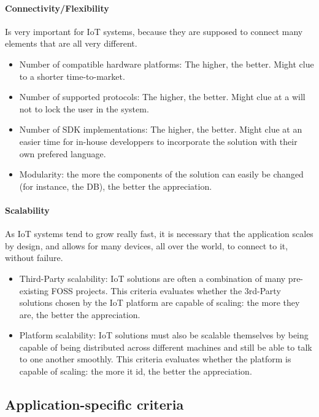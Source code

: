 \documentclass{article}
\begin{document}
\paragraph{Connectivity/Flexibility} Is very important for IoT systems, because they are supposed to connect many elements that are all very different.

\begin{itemize}
\item Number of compatible hardware platforms: The higher, the better. Might clue to a shorter time-to-market.
\item Number of supported protocols: The higher, the better. Might clue at a will not to lock the user in the system.
\item Number of SDK implementations: The higher, the better. Might clue at an easier time for in-house developpers to incorporate the solution with their own prefered language.
\item Modularity: the more the components of the solution can easily be changed (for instance, the DB), the better the appreciation.
\end{itemize}

\paragraph{Scalability} As IoT systems tend to grow really fast, it is necessary that the application scales by design, and allows for many devices, all over the world, to connect to it, without failure.

\begin{itemize}
\item Third-Party scalability: IoT solutions are often a combination of many pre-existing FOSS projects. This criteria evaluates whether the 3rd-Party solutions chosen by the IoT platform are capable of scaling: the more they are, the better the appreciation.
\item Platform scalability: IoT solutions must also be scalable themselves by being capable of being distributed across different machines and still be able to talk to one another smoothly. This criteria evaluates whether the platform is capable of scaling: the more it id, the better the appreciation.
\end{itemize}

\subsection{Application-specific criteria}
\end{document}
